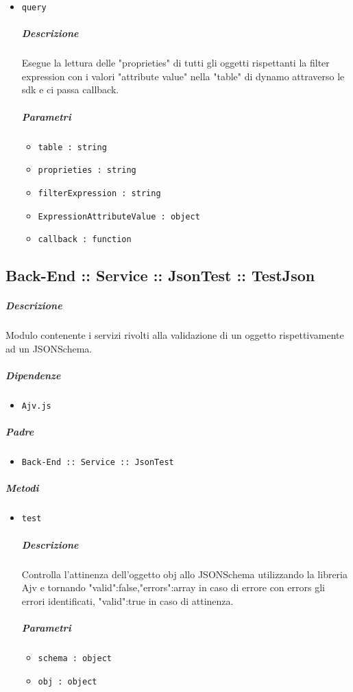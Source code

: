 \documentclass[../ManualeSviluppatore_v2.0.0.tex]{subfiles}
\begin{document}
\begin{itemize}
\item \texttt{query}
\subparagraph{Descrizione} Esegue la lettura delle "proprieties" di tutti gli oggetti rispettanti la filter expression con i valori "attribute value" nella "table" di dynamo attraverso le sdk e ci passa callback.
\subparagraph{Parametri}
\begin{itemize}
	\item \texttt{table : string}
	\item \texttt{proprieties : string}
	\item \texttt{filterExpression : string}
	\item \texttt{ExpressionAttributeValue : object}
	\item \texttt{callback : function}
\end{itemize}
\end{itemize}

\subsection{Back-End :: Service :: JsonTest :: TestJson}
\subparagraph{Descrizione} Modulo contenente i servizi rivolti alla validazione di un oggetto rispettivamente ad un JSONSchema.
\subparagraph{Dipendenze}
\begin{itemize}
	\item \texttt{Ajv.js}
\end{itemize}
\subparagraph{Padre}
\begin{itemize}
	\item \texttt{Back-End :: Service :: JsonTest}
\end{itemize}
\subparagraph{Metodi}\begin{itemize}
\item \texttt{test}
\subparagraph{Descrizione} Controlla l'attinenza dell'oggetto obj allo JSONSchema utilizzando la libreria Ajv e tornando {"valid":false,"errors":array} in caso di errore con errors gli errori identificati, {"valid":true} in caso di attinenza.
\subparagraph{Parametri}
\begin{itemize}
	\item \texttt{schema : object}
	\item \texttt{obj : object}
\end{itemize}
\end{itemize}

\newpage
\end{document}
